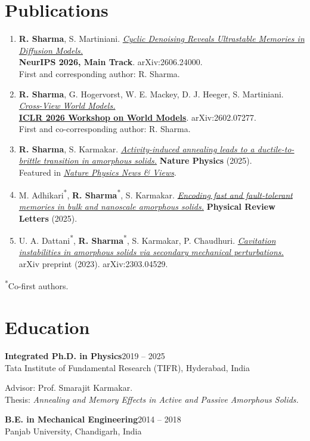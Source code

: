 \documentclass[11pt,letterpaper]{article}
\newcommand{\role}[3]{\textbf{#1}\hfill #2\\#3\par}
\begin{document}
\section{Publications}
\begin{enumerate}
\item \textbf{R. Sharma}, S. Martiniani.
\href{https://arxiv.org/abs/2606.24000}{\textit{Cyclic Denoising Reveals Ultrastable Memories in Diffusion Models.}}\\
\textbf{NeurIPS 2026, Main Track}. arXiv:2606.24000.\\
{\small First and corresponding author: R. Sharma.}

\item \textbf{R. Sharma}, G. Hogervorst, W. E. Mackey, D. J. Heeger, S. Martiniani.
\href{https://arxiv.org/abs/2602.07277}{\textit{Cross-View World Models.}}\\
{\hypersetup{urlcolor=black}\href{https://openreview.net/forum?id=0g7De0sXWM}{\textbf{ICLR 2026 Workshop on World Models}}}.
arXiv:2602.07277.\\
{\small First and co-corresponding author: R. Sharma.}

\item \textbf{R. Sharma}, S. Karmakar.
\href{https://doi.org/10.1038/s41567-024-02724-5}{\textit{Activity-induced annealing leads to a ductile-to-brittle transition in amorphous solids.}}
\textbf{Nature Physics} (2025).\\
{\small Featured in \href{https://www.nature.com/articles/s41567-025-02900-1}{\textit{Nature Physics News \& Views}}.}

\item M. Adhikari\textsuperscript{*}, \textbf{R. Sharma}\textsuperscript{*}, S. Karmakar.
\href{https://doi.org/10.1103/PhysRevLett.134.018202}{\textit{Encoding fast and fault-tolerant memories in bulk and nanoscale amorphous solids.}}
\textbf{Physical Review Letters} (2025).

\item U. A. Dattani\textsuperscript{*}, \textbf{R. Sharma}\textsuperscript{*}, S. Karmakar, P. Chaudhuri.
\href{https://arxiv.org/abs/2303.04529}{\textit{Cavitation instabilities in amorphous solids via secondary mechanical perturbations.}}
arXiv preprint (2023). arXiv:2303.04529.
\end{enumerate}
{\small \textsuperscript{*}Co-first authors.}

\section{Education}
\role{Integrated Ph.D. in Physics}{2019 -- 2025}
{Tata Institute of Fundamental Research (TIFR), Hyderabad, India}
Advisor: Prof. Smarajit Karmakar.\\
{\small Thesis: \textit{Annealing and Memory Effects in Active and Passive Amorphous Solids.}}\par
\vspace{6pt}
\role{B.E. in Mechanical Engineering}{2014 -- 2018}
{Panjab University, Chandigarh, India}
\end{document}
